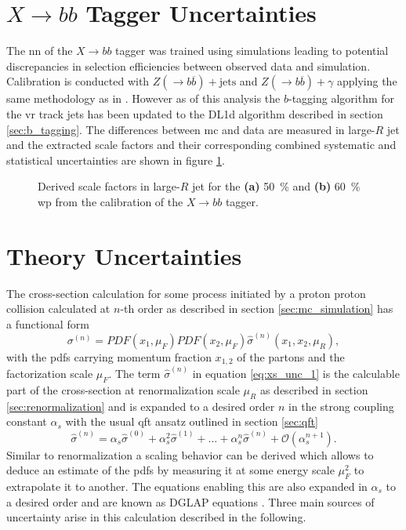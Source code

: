 \section{$X\rightarrow bb$ Tagger Uncertainties}
The \ac{nn} of the $X\rightarrow bb$ tagger was trained using simulations leading to potential discrepancies in selection efficiencies between observed data and simulation. Calibration is conducted with $Z(\rightarrow b\overline{b})+\text{jets}$ and $Z(\rightarrow b\overline{b})+\gamma$ applying the same methodology as in \citep{ATL-PHYS-PUB-2021-035}. However as of this analysis the $b$-tagging algorithm for the \ac{vr} track jets has been updated to the DL1d algorithm described in section \ref{sec:b_tagging}. The differences between \ac{mc} and data are measured in large-$R$ jet \pt and the extracted scale factors and their corresponding combined systematic and statistical uncertainties are shown in figure \ref{fig:xbb_sf}.
\begin{figure}
    \centering
    \caption[]{Derived scale factors in large-$R$ jet \pt for the \textbf{(a)} \qty[]{50}{\percent} and \textbf{(b)} \qty[]{60}{\percent} \ac{wp} from the calibration of the $X\rightarrow bb$ tagger.}
    \label{fig:xbb_sf}
\end{figure}

\section{Theory Uncertainties}
The cross-section calculation for some process initiated by a proton proton collision calculated at $n$-th order as described in section \ref{sec:mc_simulation} has a functional form 
\begin{equation}
    \sigma^{(n)} = PDF(x_1, \mu_F)  PDF(x_2, \mu_F) \hat{\sigma}^{(n)}(x_1,x_2,\mu_R),
    \label{eq:xs_unc_1}
\end{equation}
with the \acfp{pdf} carrying momentum fraction $x_{1,2}$ of the partons and the factorization scale $\mu_F$. The term $\hat{\sigma}^{(n)}$ in equation \ref{eq:xs_unc_1} is the calculable part of the cross-section at renormalization scale $\mu_R$ as described in section \ref{sec:renormalization} and is expanded to a desired order $n$ in the strong coupling constant $\alpha_s$ with the usual \ac{qft} ansatz outlined in section \ref{sec:qft}
\begin{equation}
    \hat{\sigma}^{(n)} = \alpha_s \hat{\sigma}^{(0)} + \alpha_s^2 \hat{\sigma}^{(1)} + \ldots + \alpha_s^n \hat{\sigma}^{(n)} + \mathcal{O}(\alpha_s^{n+1}).
    \label{eq:xs_unc_2}
\end{equation}
Similar to renormalization a scaling behavior can be derived which allows to deduce an estimate of the \acp{pdf} by measuring it at some energy scale $\mu_F^2$ to extrapolate it to another. The equations enabling this are also expanded in $\alpha_s$ to a desired order and are known as DGLAP equations \citep{halzen1984introductory}. Three main sources of uncertainty arise in this calculation described in the following.

